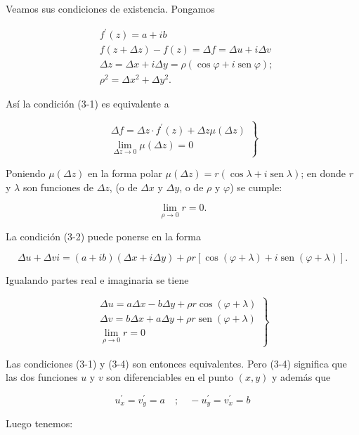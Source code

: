 \documentclass[10pt]{article}
\theoremstyle{plain}
\theoremstyle{definition}
\theoremstyle{remark}
\begin{document}
Veamos sus condiciones de existencia. Pongamos

$$
\begin{aligned}
& f^{\prime}(z)=a+i b \\
& f(z+\Delta z)-f(z)=\Delta f=\Delta u+i \Delta v \\
& \Delta z=\Delta x+i \Delta y=\rho(\cos \varphi+i \operatorname{sen} \varphi) ; \\
& \rho^{2}=\Delta x^{2}+\Delta y^{2} .
\end{aligned}
$$

Así la condición (3-1) es equivalente a

\[
\left.\begin{array}{l}
\Delta f=\Delta z \cdot f^{\prime}(z)+\Delta z \mu(\Delta z)  \tag{3-2}\\
\lim _{\Delta z \rightarrow 0} \mu(\Delta z)=0
\end{array}\right\}
\]

Poniendo $\mu(\Delta z)$ en la forma polar $\mu(\Delta z)=r(\cos \lambda+i \operatorname{sen} \lambda)$; en donde $r$ y $\lambda$ son funciones de $\Delta z$, (o de $\Delta x$ y $\Delta y$, o de $\rho$ y $\varphi$) se cumple:


\begin{equation*}
\lim _{\rho \rightarrow 0} r=0 . \tag{3-3}
\end{equation*}


La condición (3-2) puede ponerse en la forma

$$
\Delta u+\Delta v i=(a+i b)(\Delta x+i \Delta y)+\rho r[\cos (\varphi+\lambda)+i \operatorname{sen}(\varphi+\lambda)] .
$$

Igualando partes real e imaginaria se tiene

\[
\left.\begin{array}{l}
\Delta u=a \Delta x-b \Delta y+\rho r \cos (\varphi+\lambda)  \tag{3-4}\\
\Delta v=b \Delta x+a \Delta y+\rho r \operatorname{sen}(\varphi+\lambda) \\
\lim _{\rho \rightarrow 0} r=0
\end{array}\right\}
\]

Las condiciones (3-1) y (3-4) son entonces equivalentes.
Pero (3-4) significa que las dos funciones $u$ y $v$ son diferenciables en el punto $(x, y)$ y además que

$$
u_{x}^{\prime}=v_{y}^{\prime}=a \quad ; \quad-u_{y}^{\prime}=v_{x}^{\prime}=b
$$

Luego tenemos:
\end{document}

